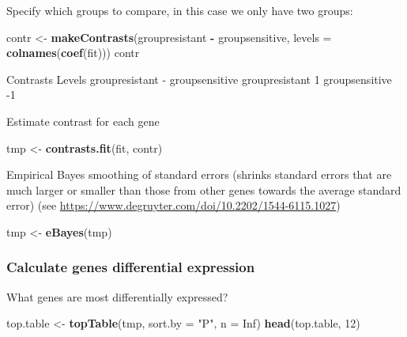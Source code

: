 \documentclass[
]{article}
\newenvironment{Shaded}{\begin{snugshade}}{\end{snugshade}}
\newcommand{\AttributeTok}[1]{\textcolor[rgb]{0.13,0.29,0.53}{#1}}
\newcommand{\ConstantTok}[1]{\textcolor[rgb]{0.56,0.35,0.01}{#1}}
\newcommand{\DecValTok}[1]{\textcolor[rgb]{0.00,0.00,0.81}{#1}}
\newcommand{\FunctionTok}[1]{\textcolor[rgb]{0.13,0.29,0.53}{\textbf{#1}}}
\newcommand{\NormalTok}[1]{#1}
\newcommand{\OtherTok}[1]{\textcolor[rgb]{0.56,0.35,0.01}{#1}}
\newcommand{\SpecialCharTok}[1]{\textcolor[rgb]{0.81,0.36,0.00}{\textbf{#1}}}
\newcommand{\StringTok}[1]{\textcolor[rgb]{0.31,0.60,0.02}{#1}}
\begin{document}
Specify which groups to compare, in this case we only have two groups:

\begin{Shaded}
\begin{Highlighting}[]
\NormalTok{contr }\OtherTok{\textless{}{-}} \FunctionTok{makeContrasts}\NormalTok{(groupresistant }\SpecialCharTok{{-}}\NormalTok{ groupsensitive, }\AttributeTok{levels =} \FunctionTok{colnames}\NormalTok{(}\FunctionTok{coef}\NormalTok{(fit)))}
\NormalTok{contr}
\end{Highlighting}
\end{Shaded}

\begin{Shaded}
\begin{Highlighting}[]
\NormalTok{                Contrasts}
\NormalTok{Levels           groupresistant {-} groupsensitive}
\NormalTok{  groupresistant                               1}
\NormalTok{  groupsensitive                              {-}1}
\end{Highlighting}
\end{Shaded}

Estimate contrast for each gene

\begin{Shaded}
\begin{Highlighting}[]
\NormalTok{tmp }\OtherTok{\textless{}{-}} \FunctionTok{contrasts.fit}\NormalTok{(fit, contr)}
\end{Highlighting}
\end{Shaded}

Empirical Bayes smoothing of standard errors (shrinks standard errors
that are much larger or smaller than those from other genes towards the
average standard error) (see
\url{https://www.degruyter.com/doi/10.2202/1544-6115.1027})

\begin{Shaded}
\begin{Highlighting}[]
\NormalTok{tmp }\OtherTok{\textless{}{-}} \FunctionTok{eBayes}\NormalTok{(tmp)}
\end{Highlighting}
\end{Shaded}

\subsubsection{Calculate genes differential
expression}\label{calculate-genes-differential-expression}

What genes are most differentially expressed?

\begin{Shaded}
\begin{Highlighting}[]
\NormalTok{top.table }\OtherTok{\textless{}{-}} \FunctionTok{topTable}\NormalTok{(tmp, }\AttributeTok{sort.by =} \StringTok{"P"}\NormalTok{, }\AttributeTok{n =} \ConstantTok{Inf}\NormalTok{)}
\FunctionTok{head}\NormalTok{(top.table, }\DecValTok{12}\NormalTok{)}
\end{Highlighting}
\end{Shaded}
\end{document}
